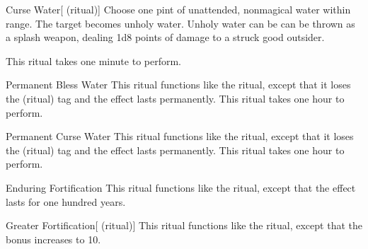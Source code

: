 \lowercase{\hypertarget{spell:Curse Water}{}}\label{spell:Curse Water}
\begin{attuneability}[\nth{1}]{\hypertarget{spell:Curse Water}{Curse Water}}[ (ritual)]
Choose one pint of unattended, nonmagical water within \rngclose range.
The target becomes unholy water.
Unholy water can be can be thrown as a splash weapon, dealing 1d8 points of damage to a struck good outsider.

This ritual takes one minute to perform.
\end{attuneability}
\vspace{0.25em}



\lowercase{\hypertarget{spell:Permanent Bless Water}{}}\label{spell:Permanent Bless Water}
\begin{freeability}[\nth{2}]{\hypertarget{spell:Permanent Bless Water}{Permanent Bless Water}}
This ritual functions like the  ritual, except that it loses the  (ritual) tag and the effect lasts permanently.
This ritual takes one hour to perform.
\end{freeability}
\vspace{0.25em}



\lowercase{\hypertarget{spell:Permanent Curse Water}{}}\label{spell:Permanent Curse Water}
\begin{freeability}[\nth{2}]{\hypertarget{spell:Permanent Curse Water}{Permanent Curse Water}}
This ritual functions like the  ritual, except that it loses the  (ritual) tag and the effect lasts permanently.
This ritual takes one hour to perform.
\end{freeability}
\vspace{0.25em}



\lowercase{\hypertarget{spell:Enduring Fortification}{}}\label{spell:Enduring Fortification}
\begin{freeability}[\nth{3}]{\hypertarget{spell:Enduring Fortification}{Enduring Fortification}}
This ritual functions like the  ritual, except that the effect lasts for one hundred years.
\end{freeability}
\vspace{0.25em}



\lowercase{\hypertarget{spell:Greater Fortification}{}}\label{spell:Greater Fortification}
\begin{attuneability}[\nth{3}]{\hypertarget{spell:Greater Fortification}{Greater Fortification}}[ (ritual)]
This ritual functions like the  ritual, except that the  bonus increases to 10.
\end{attuneability}
\vspace{0.25em}



